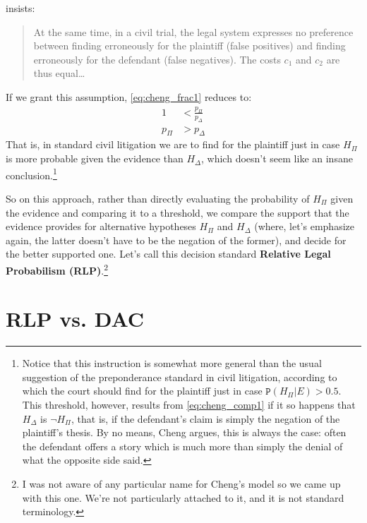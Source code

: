 \documentclass{ifcolog}
\newcommand{\pr}[1]{\mbox{$\mathtt{P}(#1)$}}
\newcommand{\n}{\neg}
\begin{document}
\noindent \citep[1261]{cheng2012reconceptualizing} insists:
\begin{quote}
At the same time, in a civil trial, the legal system expresses no preference between finding erroneously for the plaintiff (false positives) and finding erroneously for the defendant (false negatives). The costs $c_1$ and $c_2$ are thus equal\dots
\end{quote}
\noindent If we grant this assumption, \eqref{eq:cheng_frac1} reduces to:
\begin{align}
\nonumber 1 &< \frac{p_\Pi}{p_\Delta} \\
\label{eq:cheng_comp1} p_\Pi &> p_\Delta 
\end{align}
\noindent That is, in standard civil litigation we are to find for the plaintiff just in case $H_\Pi$ is more probable given the evidence than $H_\Delta$, which doesn't seem like an insane conclusion.\footnote{Notice that this instruction is somewhat more general than the usual suggestion of the preponderance standard in civil litigation,  according to which the court should find for the plaintiff just in case $\pr{H_\Pi\vert E} >0.5$. This threshold, however, results from \eqref{eq:cheng_comp1} if it so happens that $H_\Delta$ is $\n H_\Pi$, that is, if the defendant's claim is simply the negation of the plaintiff's thesis.  By no means, Cheng argues, this is always the case: often the defendant offers a story which is much more than simply the denial of what the opposite side said.}


 So on this approach, rather than directly evaluating the probability of $H_\Pi$ given the evidence and comparing it to a threshold, we compare the support that the evidence provides for alternative hypotheses $H_\Pi$ and $H_\Delta$ (where, let's emphasize again, the latter doesn't have to be the negation of the former), and decide for the better supported one. Let's call this decision standard \textbf{Relative Legal Probabilism (RLP)}.\footnote{I was not aware of any particular name for Cheng's model so we came up with this one. We're not particularly attached to it, and it is not standard terminology.}

\section{RLP vs. DAC}\label{sec:RLP_vs_DAC}
\end{document}
